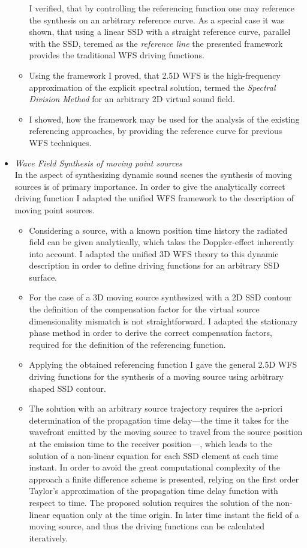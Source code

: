 \documentclass[a4paper,10pt]{article}
\begin{document}
\begin{itemize}
\begin{itemize}
I verified, that by controlling the referencing function one may reference the synthesis on an arbitrary reference curve. As a special case it was shown, that using a linear SSD with a straight reference curve, parallel with the SSD, teremed as the \emph{reference line} the presented framework provides the traditional WFS driving functions.
\item Using the framework I proved, that 2.5D WFS is the high-frequency approximation of the explicit spectral solution, termed the \emph{Spectral Division Method} for an arbitrary 2D virtual sound field.
\item I showed, how the framework may be used for the analysis of the existing referencing approaches, by providing the reference curve for previous WFS techniques.
\end{itemize}
%
\item \emph{Wave Field Synthesis of moving point sources}\\
In the aspect of synthesizing dynamic sound scenes the synthesis of moving sources is of primary importance. In order to give the analytically correct driving function I adapted the unified WFS framework to the description of moving point sources.
\begin{itemize}
\item Considering a source, with a known position time history the radiated field can be given analytically, which takes the Doppler-effect inherently into account. I adapted the unified 3D WFS theory to this dynamic description in order to define driving functions for an arbitrary SSD surface.
\item For the case of a 3D moving source synthesized with a 2D SSD contour the definition of the compensation factor for the virtual source dimensionality mismatch is not straightforward. I adapted the stationary phase method in order to derive the correct compensation factors, required for the definition of the referencing function. 
\item Applying the obtained referencing function I gave the general 2.5D WFS driving functions for the synthesis of a moving source using arbitrary shaped SSD contour.
\item The solution with an arbitrary source trajectory requires the a-priori determination of the propagation time delay---the time it takes for the wavefront emitted by the moving source to travel from the source position at the emission time to the receiver position---, which leads to the solution of a non-linear equation for each SSD element at each time instant. In order to avoid the great computational complexity of the approach a finite difference scheme is presented, relying on the first order Taylor's approximation of the propagation time delay function with respect to time. The proposed solution requires the solution of the non-linear equation only at the time origin. In later time instant the field of a moving source, and thus the driving functions can be calculated iteratively.

\end{itemize}
\end{itemize}
\end{document}
